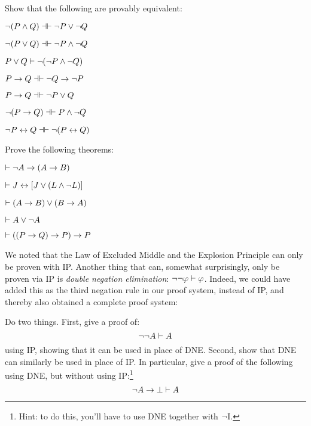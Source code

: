 \problempart
Show that the following are provably equivalent:
\begin{earg}
\item $\enot (P \eand Q) \pequiv \enot P \eor \enot Q$
\item $\enot (P \eor Q) \pequiv \enot P \eand \enot Q$
\item $P \vee Q \vdash \neg (\neg P \wedge \neg Q)$
\item $P \eif Q \pequiv \enot Q \eif \enot P$
\item $P \eif Q \pequiv \enot P \eor Q$
\item $\enot (P \eif Q) \pequiv P \eand \enot Q$
\item $\enot P \eiff Q \pequiv \enot(P \eiff Q)$
\end{earg}

\problempart
Prove the following theorems:

\begin{earg}
\item $\vdash \neg A \rightarrow (A \rightarrow B)$
\item $\vdash J \leftrightarrow [J\vee (L\wedge\neg L)]$
\item $\vdash (A \rightarrow B) \vee (B \rightarrow A)$
\item $\vdash A \vee \neg A$ %
\item $\vdash ((P \rightarrow Q) \rightarrow P) \rightarrow P$ %
\end{earg}

\problempart
We noted that the Law of Excluded Middle and the Explosion Principle can only be proven with IP.  Another thing that can, somewhat surprisingly, only be proven via IP is \emph{double negation elimination}:  $\neg \neg \mathcal{\varphi} \vdash \mathcal{\varphi}$.  Indeed, we could have added this as the third negation rule in our proof system, instead of IP, and thereby also obtained a complete proof system:


\noindent Do two things.  First, give a proof of:
$$\neg \neg A \vdash A$$
using IP, showing that it can be used in place of DNE.  Second, show that DNE can similarly be used in place of IP.  In particular, give a proof of the following using DNE, but without using IP:\footnote{Hint: to do this, you'll have to use DNE together with $\neg$I.}
$$\neg A \rightarrow \bot \vdash  A$$



